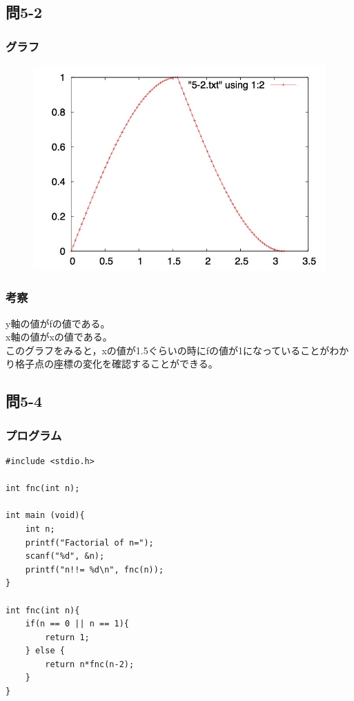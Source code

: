 \documentclass{jarticle}
\begin{document}
\subsection{問5-2\\}
\subsubsection{グラフ\\}
\begin{figure}[htb]
 \begin{center}
 \includegraphics[clip, width=15cm]{5-2.jpg} 
  \label{fig:level}
 \end{center}
\end{figure}
\subsubsection{考察\\}
y軸の値がfの値である。\\
x軸の値がxの値である。\\
このグラフをみると，xの値が1.5ぐらいの時にfの値が1になっていることがわかり格子点の座標の変化を確認することができる。\\

\subsection{問5-4\\}
\subsubsection{プログラム\\}
\begin{breakbox}
\begin{verbatim}
#include <stdio.h>

int fnc(int n);

int main (void){
    int n;
    printf("Factorial of n=");
    scanf("%d", &n);
    printf("n!!= %d\n", fnc(n));
}

int fnc(int n){
    if(n == 0 || n == 1){
        return 1;
    } else {
        return n*fnc(n-2);
    }
}
\end{verbatim}
\end{breakbox}
\end{document}
